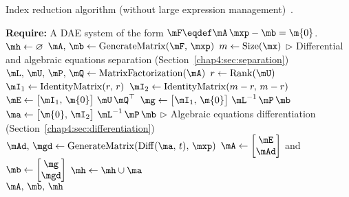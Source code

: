 \begin{breakablealgorithm}
  \caption{Index reduction algorithm (without large expression management)~\cite{stocco2024symbolic}.}
  \label{chap4:alg:index_reduction}
  \begin{algorithmic}[1]
    \State \textbf{Require:} A \ac{DAE} system of the form $\mF \eqdef \mA \, \mxp - \mb = \m{0}$.
     
      \State $\mh \gets \varnothing$ 
      \State $\mA, \, \mb \gets \mathrm{GenerateMatrix}(\mF, \, \mxp)$ 
      \State $m \gets \mathrm{Size}(\mx)$
        \State $\displaystyle\triangleright$ Differential and algebraic equations separation (Section~\ref{chap4:sec:separation})
        \State $\mL, \, \mU, \, \mP, \, \mQ \gets \mathrm{MatrixFactorization}(\mA)$ 
        \State $r \gets \mathrm{Rank}(\mU)$ 
        \State $\mI_1 \gets \mathrm{IdentityMatrix}(r, \, r)$ 
        \State $\mI_2 \gets \mathrm{IdentityMatrix}(m-r, \, m-r)$ 
        \State $\mE \gets \begin{bmatrix} \mI_1, \, \m{0} \end{bmatrix} \, \mU \, \mQ^\top$ 
        \State $\mg \gets \begin{bmatrix} \mI_1, \, \m{0} \end{bmatrix} \, \mL^{-1} \, \mP \, \mb$ 
        \State $\ma \gets \begin{bmatrix} \m{0}, \, \mI_2 \end{bmatrix} \, \mL^{-1} \, \mP \, \mb$ 
        \State $\displaystyle\triangleright$ Algebraic equations differentiation (Section~\ref{chap4:sec:differentiation})
        \State $\mAd, \, \mgd \gets \mathrm{GenerateMatrix}(\mathrm{Diff}(\ma, \, t), \, \mxp)$ 
        \State $\mA \gets \begin{bmatrix} \mE \\ \mAd \end{bmatrix}$ and $\mb \gets \begin{bmatrix} \mg \\ \mgd \end{bmatrix}$
        \State $\mh \gets \mh \cup \ma$ 
      \EndWhile \\
      \Return $\mA, \, \mb, \, \mh$ 
    \EndProcedure
  \end{algorithmic}
\end{breakablealgorithm}

